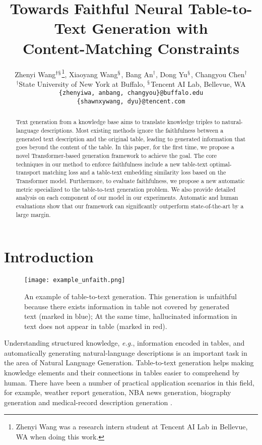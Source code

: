 \documentclass[11pt,a4paper]{article}
\title{Towards Faithful Neural Table-to-Text Generation with \\ Content-Matching Constraints}
\author{
  Zhenyi Wang$^{\dagger\mathsection}$\thanks{Zhenyi Wang was a research intern student at Tencent AI Lab in Bellevue, WA when doing this work.}, Xiaoyang Wang$^{\mathsection}$, Bang An$^{\dagger}$,  Dong Yu$^{\mathsection}$, Changyou Chen$^{\dagger}$\\
  $^{\dagger}$State University of New York at Buffalo, $^{\mathsection}$Tencent AI Lab, Bellevue, WA\\
  \texttt{\{zhenyiwa, anbang, changyou\}@buffalo.edu}\\
  \texttt{\{shawnxywang, dyu\}@tencent.com}
}
\date{}
\begin{document}
\maketitle
\begin{abstract}
Text generation from a knowledge base aims to translate knowledge triples to natural-language descriptions. Most existing methods ignore the faithfulness between a generated text description and the original table, leading to generated information that goes beyond the content of the table. In this paper, for the first time, we propose a novel Transformer-based generation framework to achieve the goal. The core techniques in our method to enforce faithfulness include a new table-text optimal-transport matching loss and a table-text embedding similarity loss based on the Transformer model. Furthermore, to evaluate faithfulness, we propose a new automatic metric specialized to the table-to-text generation problem. We also provide detailed analysis on each component of our model in our experiments. Automatic and human evaluations show that our framework can significantly outperform state-of-the-art by a large margin.

\end{abstract}

\section{Introduction}
\begin{figure}[t]
    \centering
    \texttt{[image: example\_unfaith.png]}
    \caption{An example of table-to-text generation. This generation is unfaithful because there exists information in table not covered by generated text (marked in blue); At the same time, hallucinated information in text does not appear in table (marked in red).}
    \label{fig:example}
    \vspace{-0.5cm}
\end{figure}
Understanding structured knowledge, \textit{e.g.}, information encoded in tables, and automatically generating natural-language descriptions is an important task in the area of Natural Language Generation. 
Table-to-text generation helps making knowledge elements and their connections in tables easier to comprehend by human. 
There have been a number of practical application scenarios in this field, for example, weather report generation, NBA news generation, biography generation and medical-record description generation \cite{weather, NBA, bio, medical}. 
\end{document}
